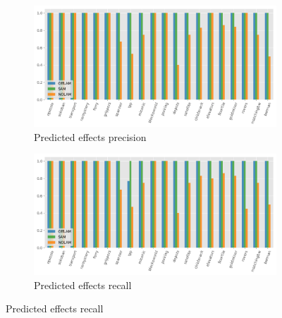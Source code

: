 \begin{figure}[ht]
  \begin{subfigure}[b]{0.45\textwidth}
    \includegraphics[width=\textwidth]{figures/2_traces/predeffs_precision.png}
    \caption{Predicted effects precision}
  \end{subfigure}
  \hfill
  \begin{subfigure}[b]{0.45\textwidth}
    \includegraphics[width=\textwidth]{figures/2_traces/predeffs_recall.png}
    \caption{Predicted effects recall}
  \end{subfigure}

  \vspace{1em}


\end{figure}
